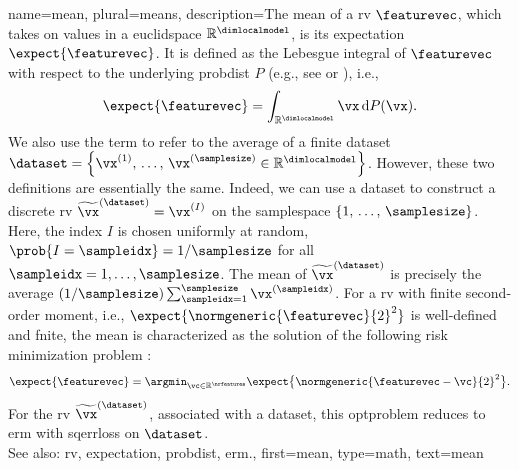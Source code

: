 {name={mean}, plural={means},
	description={The  mean of a \gls{rv} $\featurevec$, which takes 
 		on values in a \gls{euclidspace} $\mathbb{R}^{\dimlocalmodel}$, is its 
 		\gls{expectation} $\expect\{\featurevec\}$. It is defined as the Lebesgue 
 		integral of $\featurevec$ with respect to the underlying \gls{probdist} $P$ (e.g., 
		see \cite{RudinBookPrinciplesMatheAnalysis} or \cite{BillingsleyProbMeasure}), i.e.,
		\[
			\expect\{\featurevec\} = \int_{\mathbb{R}^{\dimlocalmodel}} \vx \, \mathrm{d}P(\vx).
		\]  
		We also use the term to refer to the average of a finite \gls{dataset}
		$\dataset = \left\{ \vx^{(1)}, \,\ldots, \,\vx^{(\samplesize)} \in \mathbb{R}^{\dimlocalmodel}\right\}$. 
		However, these two definitions are essentially the same. Indeed, we can use 
		a \gls{dataset} to construct a discrete \gls{rv} $\widetilde{\vx}^{(\dataset)}=\vx^{(I)}$ on 
		the \gls{samplespace} $\{1, \,\ldots, \,\samplesize\}$. Here, the index $I$ is 
		chosen uniformly at random, $\prob{I=\sampleidx}=1/\samplesize$ for all 
		$\sampleidx=1,\ldots,\samplesize$. The mean of $\widetilde{\vx}^{(\dataset)}$ is 
		precisely the average $({1}/{\samplesize}) \sum_{\sampleidx=1}^{\samplesize} \vx^{(\sampleidx)}$.
		For a \gls{rv} with finite second-order moment, i.e., 
		$\expect\{ \normgeneric{\featurevec}{2}^{2} \}$ is well-defined and fnite, 
		the mean is characterized as the solution of the 
		following \gls{risk} minimization problem \cite{BertsekasProb}:
		\[
			\expect\{\featurevec\} = \argmin_{\vc \in \mathbb{R}^{\nrfeatures}} 
			\expect \big\{\normgeneric{\featurevec - \vc}{2}^{2}\big \}.
		\]
		For the \gls{rv} $\widetilde{\vx}^{(\dataset)}$, associated with a \gls{dataset}, 
		this \gls{optproblem} reduces to \gls{erm} with \gls{sqerrloss} on $\dataset$. 
		\\ 
		See also: \gls{rv}, \gls{expectation}, \gls{probdist}, \gls{erm}.}, 
	first={mean}, 
	type=math,
	text={mean} 
}

